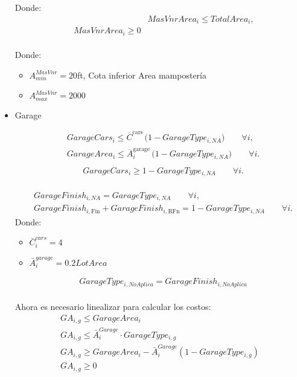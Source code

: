 \begin{itemize}
Donde:\\
\begin{align}

& MasVnrArea_i \le TotalArea_i,\\ \quad MasVnrArea_i \ge 0
\end{align}\\
Donde:\\
    \begin{itemize}
        \item $A_{min}^{MasVnr}=20 $ft, Cota inferior Area mampostería
        \item $A_{max}^{MasVnr}=2000$
    \end{itemize}


    \item {Garage}

\begin{align}
& GarageCars_i \le \overline{C}^{\text{cars}} \,\big(1 - GarageType_{i,NA}\big) \qquad \forall i,\\
& GarageArea_i \le \overline{A}^{\text{garage}}_i \,\big(1 - GarageType_{i,NA}\big) \qquad \forall i.
\end{align}
\begin{align}\\
& GarageCars_i \ge 1 - GarageType_{i,NA} \qquad \forall i.
\end{align}\\
\begin{align}
& GarageFinish_{i,NA} = GarageType_{i,NA} \qquad \forall i,\\
& GarageFinish_{i,\text{Fin}} + GarageFinish_{i,\text{RFn}} 
  = 1 - GarageType_{i,NA} \qquad \forall i.
\end{align}
Donde:
    \begin{itemize}
        \item $\bar{C}_{i}^{cars}=4$
        \item $\bar{A}_{i}^{garage}=0.2 LotArea$
    \end{itemize}
\begin{align}
    &GarageType_{i,NoAplica}=GarageFinish_{i,NoAplica}
\end{align}\\
Ahora es necesario linealizar para calcular los costos:
\\
\begin{align}
    GA_{i,g}\leq GarageArea_{i}\\
    GA_{i,g}\leq \bar A_{i}^{Garage}\cdot GarageType_{i,g}\\
    GA_{i,g}\geq GarageArea_{i}-\bar A_{i}^{Garage}(1-GarageType_{i,g})\\
    GA_{i,g}\geq 0
\end{align}


\end{itemize}
